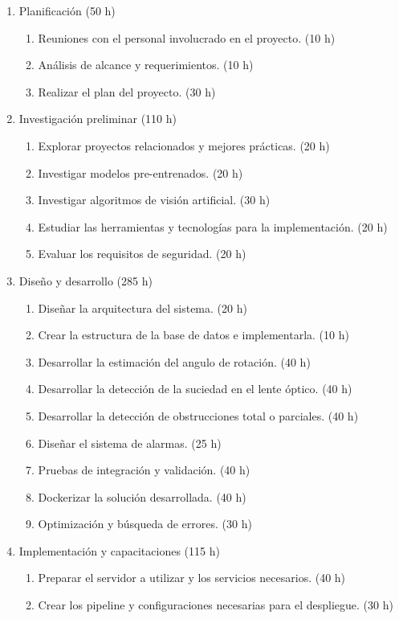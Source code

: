 \documentclass[
11pt, %
]{charter}
\begin{document}
\begin{enumerate}
\item Planificación (50 h)
	\begin{enumerate}
	\item Reuniones con el personal involucrado en el proyecto. (10 h)
	\item Análisis de alcance y requerimientos. (10 h)
	\item Realizar el plan del proyecto. (30 h)
	\end{enumerate}
\item Investigación preliminar (110 h)
	\begin{enumerate}
	\item Explorar proyectos relacionados y mejores prácticas. (20 h)
	\item Investigar modelos pre-entrenados. (20 h)
	\item Investigar algoritmos de visión artificial. (30 h) 
	\item Estudiar las herramientas y tecnologías para la implementación. (20 h)
	\item Evaluar los requisitos de seguridad. (20 h)
	\end{enumerate}
\item Diseño y desarrollo (285 h)
	\begin{enumerate}
	\item Diseñar la arquitectura del sistema. (20 h)
	\item Crear la estructura de la base de datos e implementarla. (10 h)
	\item Desarrollar la estimación del angulo de rotación. (40 h)
	\item Desarrollar la detección de la suciedad en el lente óptico. (40 h)
	\item Desarrollar la detección de obstrucciones total o parciales. (40 h)
	\item Diseñar el sistema de alarmas. (25 h)
	\item Pruebas de integración y validación. (40 h)
	\item Dockerizar la solución desarrollada. (40 h)
	\item Optimización y búsqueda de errores. (30 h)
	\end{enumerate}
\item Implementación y capacitaciones (115 h)
	\begin{enumerate}
	\item Preparar el servidor a utilizar y los servicios necesarios. (40 h)
	\item Crear los pipeline y configuraciones necesarias para el despliegue. (30 h)

\end{enumerate}
\end{enumerate}
\end{document}
